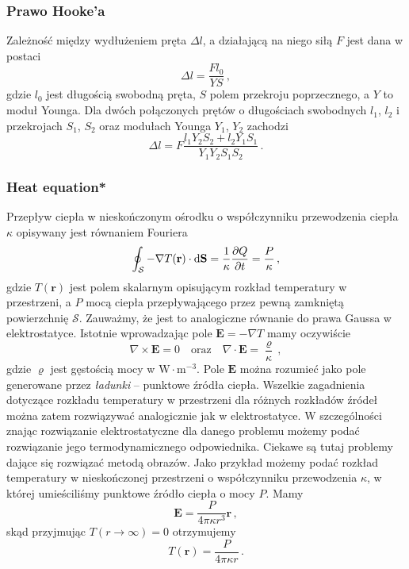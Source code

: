 \documentclass[../main.tex]{subfiles}
\begin{document}
 \subsubsection{Prawo Hooke'a}
 Zależność między wydłużeniem pręta \(\Delta l\), a działającą na niego siłą \(F\) jest dana w
 postaci
 \begin{equation*}
     \Delta l =\frac{Fl_0}{YS}\,,
 \end{equation*}
 gdzie \(l_0\) jest długością swobodną pręta, \(S\) polem przekroju poprzecznego, a \(Y\) to moduł
 Younga. Dla dwóch połączonych prętów o długościach swobodnych \(l_1\), \(l_2\) i przekrojach
 \(S_1\), \(S_2\) oraz modułach Younga \(Y_1\), \(Y_2\) zachodzi
 \begin{equation*}
     \Delta l=F\frac{l_1Y_2S_2+l_2Y_1S_1}{Y_1Y_2S_1S_2}\,.
 \end{equation*}
\subsubsection{Heat equation*}
Przepływ ciepła w nieskończonym ośrodku o współczynniku przewodzenia ciepła \(\kappa\) opisywany
jest równaniem Fouriera
\begin{equation*}
    \oint_\mathcal{S}-\nabla T(\mathbf{r})\cdot \dd{\mathbf{S}}=\frac{1}{\kappa}\pdv{Q}{t}=\frac{P}{\kappa}\,,
\end{equation*}
gdzie \(T(\mathbf{r})\) jest polem skalarnym opisującym rozkład temperatury w przestrzeni, a \(P\)
mocą ciepła przepływającego przez pewną zamkniętą powierzchnię \(\mathcal{S}\). Zauważmy, że jest to
analogiczne równanie do prawa Gaussa w elektrostatyce. Istotnie wprowadzając pole
\(\mathbf{E}=-\nabla T\) mamy oczywiście
\begin{equation*}
    \nabla\times \mathbf{E}=0\quad\text{oraz}\quad \nabla\cdot \mathbf{E}=\frac{\varrho}{\kappa}\,,
\end{equation*}
gdzie \(\varrho\) jest gęstością mocy w \(\text{W}\cdot\text{m}^{-3}\). Pole \(\mathbf{E}\) można
rozumieć jako pole generowane przez \textit{ładunki} -- punktowe źródła ciepła. Wszelkie zagadnienia
dotyczące rozkładu temperatury w przestrzeni dla różnych rozkładów źródeł można zatem rozwiązywać
analogicznie jak w elektrostatyce. W szczególności znając rozwiązanie elektrostatyczne dla danego
problemu możemy podać rozwiązanie jego termodynamicznego odpowiednika. Ciekawe są tutaj problemy
dające się rozwiązać metodą obrazów. Jako przykład możemy podać rozkład temperatury w nieskończonej
przestrzeni o współczynniku przewodzenia \(\kappa\), w której umieściliśmy punktowe źródło ciepła o
mocy \(P\). Mamy
\begin{equation*}
    \mathbf{E}=\frac{P}{4\pi\kappa r^3}\mathbf{r}\,,
\end{equation*}
skąd przyjmując \(T(r\to\infty)=0\) otrzymujemy
\begin{equation*}
    T(\mathbf{r})=\frac{P}{4\pi\kappa r}\,.
\end{equation*}
\end{document}
